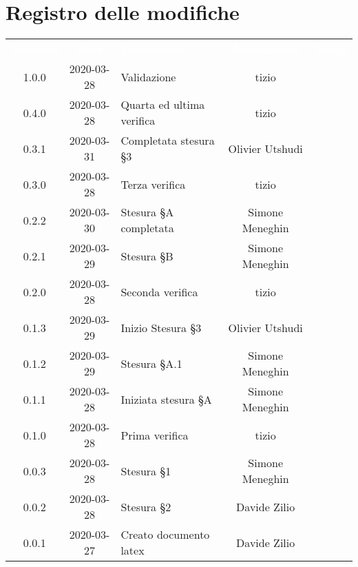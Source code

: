 \section*{Registro delle modifiche}
{
	\centering
	\begin{longtable}{ c c  C{4cm}  c  c }
		\textcolor{white}{\textbf{Versione}} & \textcolor{white}{\textbf{Data}} & \textcolor{white}{\textbf{Descrizione}} & \textcolor{white}{\textbf{Nominativo}} & \textcolor{white}{\textbf{Ruolo}}\\		
		1.0.0 & 2020-03-28 & Validazione & tizio &\RdP{} \\
		0.4.0 & 2020-03-28 & Quarta ed ultima verifica & tizio &\ver{} \\
		0.3.1 & 2020-03-31 & Completata stesura \S 3 & Olivier Utshudi &\prog{} \\
		0.3.0 & 2020-03-28 & Terza verifica & tizio &\ver{} \\
		0.2.2 & 2020-03-30 & Stesura \S A completata & Simone Meneghin &\prog{} \\
		0.2.1 & 2020-03-29 & Stesura \S B & Simone Meneghin &\prog{} \\
		0.2.0 & 2020-03-28 & Seconda verifica & tizio &\ver{} \\
		0.1.3 & 2020-03-29 & Inizio Stesura \S 3 & Olivier Utshudi &\prog{} \\
		0.1.2 & 2020-03-29 & Stesura \S A.1 & Simone Meneghin &\prog{} \\
		0.1.1 & 2020-03-28 & Iniziata stesura \S A & Simone Meneghin &\prog{} \\
		0.1.0 & 2020-03-28 & Prima verifica & tizio &\ver{} \\
		0.0.3 & 2020-03-28 & Stesura \S 1 & Simone Meneghin &\prog{} \\
		0.0.2 & 2020-03-28 & Stesura \S 2 & Davide Zilio &\prog{} \\
		0.0.1 & 2020-03-27 & Creato documento latex & Davide Zilio &\prog{}\\		
		
	\end{longtable}

}